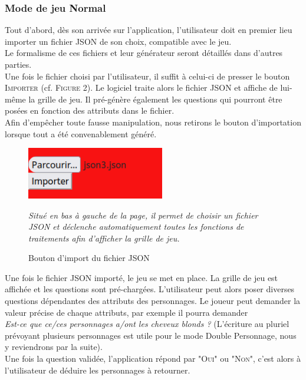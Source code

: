 \documentclass{article}
\begin{document}
            \subsubsection{Mode de jeu Normal}
  		        Tout d'abord, dès son arrivée sur l'application, l'utilisateur doit en premier lieu importer un fichier JSON de son choix, compatible avec le jeu.\\
  		        Le formalisme de ces fichiers et leur générateur seront détaillés dans d'autres parties.\\
  		        Une fois le fichier choisi par l'utilisateur, il suffit à celui-ci de presser le bouton \textsc{Importer} (cf. \textsc{Figure 2}). Le logiciel traite alors le fichier JSON et affiche de lui-même la grille de jeu. Il pré-génère également les questions qui pourront être posées en fonction des attributs dans le fichier.\\
  		        Afin d'empêcher toute fausse manipulation, nous retirons le bouton d'importation lorsque tout a été convenablement généré.\\
  		        \begin{figure}[h]
          			\centering
          		    \includegraphics[width=6cm]{images/BoutonImport.png}
          			\caption{Bouton d'import du fichier JSON}
          			\textit{Situé en bas à gauche de la page, il permet de choisir un fichier JSON et déclenche automatiquement toutes les fonctions de traitements afin d'afficher la grille de jeu.}
		        \end{figure}
		        \pagebreak
  	            \par
  	                Une fois le fichier JSON importé, le jeu se met en place. La grille de jeu est affichée et les questions sont pré-chargées. L'utilisateur peut alors poser diverses questions dépendantes des attributs des personnages. Le joueur peut demander la valeur précise de chaque attributs, par exemple il pourra demander\\
  	                \textit{Est-ce que ce/ces personnages a/ont les cheveux blonds ?} (L'écriture au pluriel prévoyant plusieurs personnages est utile pour le mode \textsf{Double Personnage}, nous y reviendrons par la suite).\\
  	                Une fois la question validée, l'application répond par "\textsc{Oui}" ou "\textsc{Non}", c'est alors à l'utilisateur de déduire les personnages à retourner.\\
\end{document}
